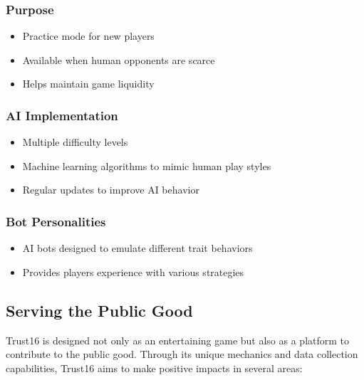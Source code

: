 \documentclass[]{article}
\begin{document}
\hypertarget{purpose}{%
\subsubsection{Purpose}\label{purpose}}

\begin{itemize}
\tightlist
\item
  Practice mode for new players
\item
  Available when human opponents are scarce
\item
  Helps maintain game liquidity
\end{itemize}

\hypertarget{ai-implementation}{%
\subsubsection{AI Implementation}\label{ai-implementation}}

\begin{itemize}
\tightlist
\item
  Multiple difficulty levels
\item
  Machine learning algorithms to mimic human play styles
\item
  Regular updates to improve AI behavior
\end{itemize}

\hypertarget{bot-personalities}{%
\subsubsection{Bot Personalities}\label{bot-personalities}}

\begin{itemize}
\tightlist
\item
  AI bots designed to emulate different trait behaviors
\item
  Provides players experience with various strategies
\end{itemize}

\hypertarget{serving-the-public-good}{%
\subsection{Serving the Public Good}\label{serving-the-public-good}}

Trust16 is designed not only as an entertaining game but also as a
platform to contribute to the public good. Through its unique mechanics
and data collection capabilities, Trust16 aims to make positive impacts
in several areas:
\end{document}
